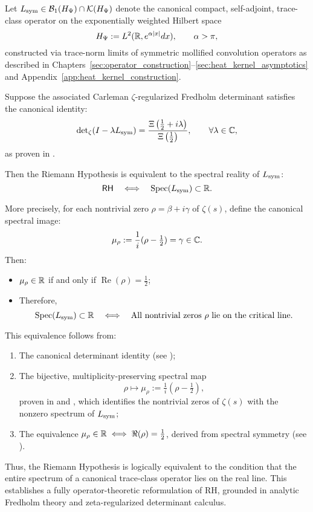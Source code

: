 \begin{theorem}
\label{thm:eq_of_rh}
Let \( L_{\mathrm{sym}} \in \mathcal{B}_1(H_{\Psi}) \cap \mathcal{K}(H_{\Psi}) \) denote the canonical compact, self-adjoint, trace-class operator on the exponentially weighted Hilbert space
\[
H_{\Psi} := L^2(\mathbb{R}, e^{\alpha |x|} dx), \qquad \alpha > \pi,
\]
constructed via trace-norm limits of symmetric mollified convolution operators as described in Chapters~\ref{sec:operator_construction}–\ref{sec:heat_kernel_asymptotics} and Appendix~\ref{app:heat_kernel_construction}.

\medskip

Suppose the associated Carleman \(\zeta\)-regularized Fredholm determinant satisfies the canonical identity:
\[
\det\nolimits_{\zeta}(I - \lambda L_{\mathrm{sym}}) = \frac{\Xi\left( \tfrac{1}{2} + i\lambda \right)}{\Xi\left( \tfrac{1}{2} \right)},
\qquad \forall \lambda \in \mathbb{C},
\]
as proven in .

\medskip

Then the Riemann Hypothesis is equivalent to the spectral reality of \( L_{\mathrm{sym}} \):
\[
\mathsf{RH} \quad \Longleftrightarrow \quad \operatorname{Spec}(L_{\mathrm{sym}}) \subset \mathbb{R}.
\]

\medskip

\noindent
More precisely, for each nontrivial zero \( \rho = \beta + i\gamma \) of \( \zeta(s) \), define the canonical spectral image:
\[
\mu_\rho := \frac{1}{i}(\rho - \tfrac{1}{2}) = \gamma \in \mathbb{C}.
\]
Then:
\begin{itemize}
  \item \( \mu_\rho \in \mathbb{R} \) if and only if \( \operatorname{Re}(\rho) = \tfrac{1}{2} \);
  \item Therefore,
  \[
  \operatorname{Spec}(L_{\mathrm{sym}}) \subset \mathbb{R}
  \quad \Longleftrightarrow \quad
  \text{All nontrivial zeros } \rho \text{ lie on the critical line}.
  \]
\end{itemize}

\medskip

\noindent
This equivalence follows from:
\begin{enumerate}
  \item The canonical determinant identity (see );
  \item The bijective, multiplicity-preserving spectral map
  \[
  \rho \longmapsto \mu_\rho := \tfrac{1}{i}(\rho - \tfrac{1}{2}),
  \]
  proven in  and , which identifies the nontrivial zeros of \( \zeta(s) \) with the nonzero spectrum of \( L_{\mathrm{sym}} \);
  \item The equivalence \( \mu_\rho \in \mathbb{R} \iff \Re(\rho) = \tfrac{1}{2} \), derived from spectral symmetry (see ).
\end{enumerate}

\medskip

\noindent
Thus, the Riemann Hypothesis is logically equivalent to the condition that the entire spectrum of a canonical trace-class operator lies on the real line. This establishes a fully operator-theoretic reformulation of RH, grounded in analytic Fredholm theory and zeta-regularized determinant calculus.
\end{theorem}
